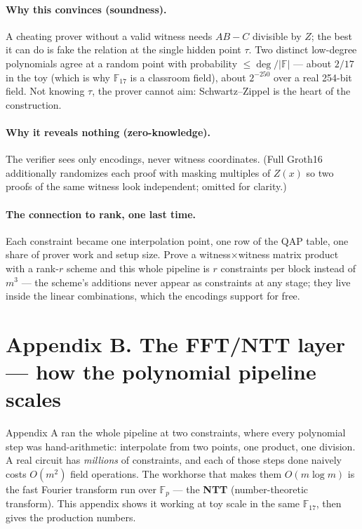 \documentclass[10pt]{article}
\begin{document}
\paragraph{Why this convinces (soundness).} A cheating prover
without a valid witness needs $AB - C$ divisible by $Z$; the best it
can do is fake the relation at the single hidden point $\tau$. Two
distinct low-degree polynomials agree at a random point with
probability $\le \deg/|\mathbb{F}|$ --- about $2/17$ in the toy
(which is why $\mathbb{F}_{17}$ is a classroom field), about
$2^{-250}$ over a real 254-bit field. Not knowing $\tau$, the prover
cannot aim: Schwartz--Zippel is the heart of the construction.

\paragraph{Why it reveals nothing (zero-knowledge).} The verifier
sees only encodings, never witness coordinates. (Full Groth16
additionally randomizes each proof with masking multiples of $Z(x)$
so two proofs of the same witness look independent; omitted for
clarity.)

\paragraph{The connection to rank, one last time.} Each constraint
became one interpolation point, one row of the QAP table, one share
of prover work and setup size. Prove a witness$\times$witness matrix
product with a rank-$r$ scheme and this whole pipeline is $r$
constraints per block instead of $m^3$ --- the scheme's additions
never appear as constraints at any stage; they live inside the
linear combinations, which the encodings support for free.


\section*{Appendix B. The FFT/NTT layer --- how the polynomial
pipeline scales}

Appendix A ran the whole pipeline at two constraints, where every
polynomial step was hand-arithmetic: interpolate from two points,
one product, one division. A real circuit has \emph{millions} of
constraints, and each of those steps done naively costs $O(m^2)$
field operations. The workhorse that makes them $O(m\log m)$ is the
fast Fourier transform run over $\mathbb{F}_p$ --- the \textbf{NTT}
(number-theoretic transform). This appendix shows it working at toy
scale in the same $\mathbb{F}_{17}$, then gives the production
numbers.
\end{document}
